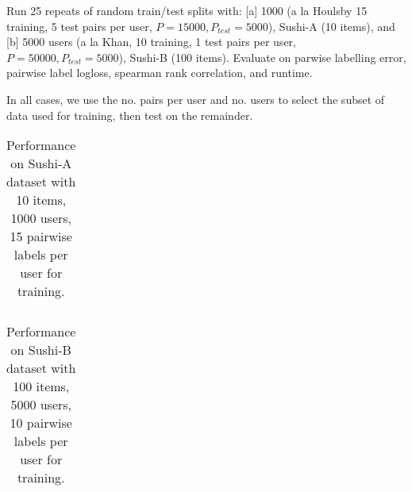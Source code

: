 Run 25 repeats of random train/test splits with:
% 
[a] 1000 (a la Houlsby 15 training, 5 test pairs per user, $P=15000,P_{test}=5000$), Sushi-A (10 items), 
and [b] 5000 users (a la Khan, 10 training, 1 test pairs per user, $P=50000, P_{test}=5000$), Sushi-B (100 items).
Evaluate on parwise labelling error, pairwise label logloss, spearman rank correlation,
and runtime.




In all cases, we use the no. pairs per user and no. users to select the subset of data used for training, then test on the remainder.

\begin{table}
\begin{tabularx}{\textwidth}{| l | c | c | c | c |}
\\ \hline
\\ \hline
\end{tabularx}
\caption{Performance on Sushi-A dataset with 10 items, 1000 users, 15 pairwise labels per user for training.}
\end{table}

\begin{table}
\begin{tabularx}{\textwidth}{| l | c | c | c | c |}
\\ \hline
\\ \hline
\end{tabularx}
\caption{Performance on Sushi-B dataset with 100 items, 5000 users, 10 pairwise labels per user for training.}
\end{table}

